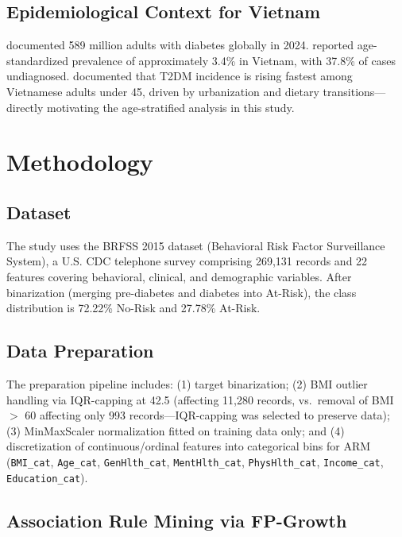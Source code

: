 ﻿\documentclass[12pt,a4paper]{article}
\begin{document}
\subsection{Epidemiological Context for Vietnam}

\citet{Duncan2025} documented 589 million adults with diabetes globally in 2024.
\citet{Vuong2024} reported age-standardized prevalence of approximately 3.4\% in Vietnam,
with 37.8\% of cases undiagnosed. \citet{Nguyen2015} documented that T2DM incidence is
rising fastest among Vietnamese adults under 45, driven by urbanization and dietary
transitions---directly motivating the age-stratified analysis in this study.

\section{Methodology}

\subsection{Dataset}

The study uses the BRFSS 2015 dataset (Behavioral Risk Factor Surveillance System),
a U.S. CDC telephone survey comprising 269,131 records and 22 features covering
behavioral, clinical, and demographic variables. After binarization (merging pre-diabetes
and diabetes into At-Risk), the class distribution is 72.22\% No-Risk and 27.78\% At-Risk.

\subsection{Data Preparation}

The preparation pipeline includes: (1) target binarization; (2) BMI outlier handling via
IQR-capping at 42.5 (affecting 11,280 records, vs.\ removal of BMI $>$ 60 affecting only
993 records---IQR-capping was selected to preserve data); (3) MinMaxScaler normalization
fitted on training data only; and (4) discretization of continuous/ordinal features into
categorical bins for ARM (\texttt{BMI\_cat}, \texttt{Age\_cat}, \texttt{GenHlth\_cat},
\texttt{MentHlth\_cat}, \texttt{PhysHlth\_cat}, \texttt{Income\_cat},
\texttt{Education\_cat}).

\subsection{Association Rule Mining via FP-Growth}
\end{document}
